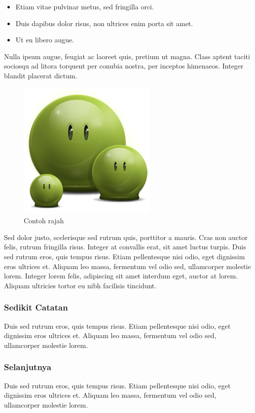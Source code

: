 \begin{itemize}
\item Etiam vitae pulvinar metus, sed fringilla orci. 
\item Duis dapibus dolor risus, non ultrices enim porta sit amet. 
\item Ut eu libero augue. 
\end{itemize}

Nulla ipsum augue, feugiat ac laoreet quis, pretium ut magna. Class aptent taciti sociosqu ad litora torquent per conubia nostra, per inceptos himenaeos. Integer blandit placerat dictum.

\begin{figure}[hbt!]\centering
\includegraphics[width=.5\textwidth]{green}
\caption{Contoh rajah}
\end{figure}

Sed dolor justo, scelerisque sed rutrum quis, porttitor a mauris. Cras non auctor felis, rutrum fringilla risus. Integer at convallis erat, sit amet luctus turpis. Duis sed rutrum eros, quis tempus risus. Etiam pellentesque nisi odio, eget dignissim eros ultrices et. Aliquam leo massa, fermentum vel odio sed, ullamcorper molestie lorem. Integer lorem felis, adipiscing sit amet interdum eget, auctor at lorem. Aliquam ultricies tortor eu nibh facilisis tincidunt.


\subsubsection{Sedikit Catatan}

Duis sed rutrum eros, quis tempus risus. Etiam pellentesque nisi odio, eget dignissim eros ultrices et. Aliquam leo massa, fermentum vel odio sed, ullamcorper molestie lorem.

\subsubsection{Selanjutnya}
Duis sed rutrum eros, quis tempus risus. Etiam pellentesque nisi odio, eget dignissim eros ultrices et. Aliquam leo massa, fermentum vel odio sed, ullamcorper molestie lorem.


